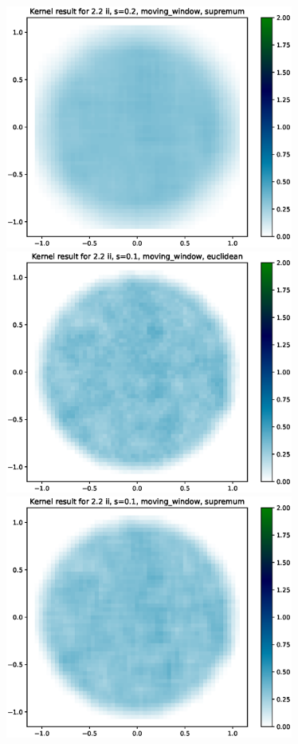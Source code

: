 \documentclass{article}
\begin{document}
\includegraphics[height=8cm]{comparisons//Kernel_result_2-2ii_s_0-2_moving_window_supremum.eps} \\
\fi
\hspace*{-1.5cm}\includegraphics[height=8cm]{comparisons//Kernel_result_2-2ii_s_0-1_moving_window_euclidean.eps} \hspace*{-1.5cm}
\includegraphics[height=8cm]{comparisons//Kernel_result_2-2ii_s_0-1_moving_window_supremum.eps}\\
\end{document}

